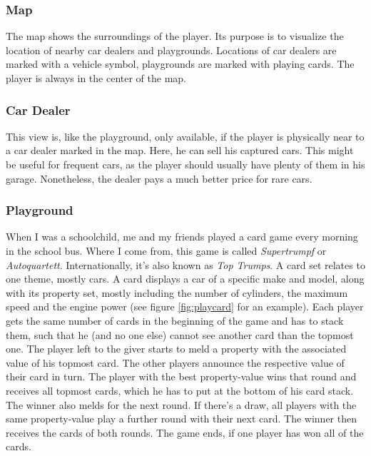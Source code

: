 \subsubsection{Map}
The map shows the surroundings of the player. Its purpose is to visualize the location of nearby car dealers and playgrounds. Locations of car dealers are marked with a vehicle symbol, playgrounds are marked with playing cards. The player is always in the center of the map.

\subsubsection{Car Dealer}
This view is, like the playground, only available, if the player is physically near to a car dealer marked in the map. Here, he can sell his captured cars. This might be useful for frequent cars, as the player should usually have plenty of them in his garage. Nonetheless, the dealer pays a much better price for rare cars.

\subsubsection{Playground}
When I was a schoolchild, me and my friends played a card game every morning in the school bus. Where I come from, this game is called \emph{Supertrumpf} or \emph{Autoquartett}. Internationally, it's also known as \emph{Top Trumps}. A card set relates to one theme, mostly cars. A card displays a car of a specific make and model, along with its property set, mostly including the number of cylinders, the maximum speed and the engine power (see figure \ref{fig:playcard} for an example). Each player gets the same number of cards in the beginning of the game and has to stack them, such that he (and no one else) cannot see another card than the topmost one. The player left to the giver starts to meld a property with the associated value of his topmost card. The other players announce the respective value of their card in turn. The player with the best property-value wins that round and receives all topmost cards, which he has to put at the bottom of his card stack. The winner also melds for the next round. If there's a draw, all players with the same property-value play a further round with their next card. The winner then receives the cards of both rounds. The game ends, if one player has won all of the cards.

